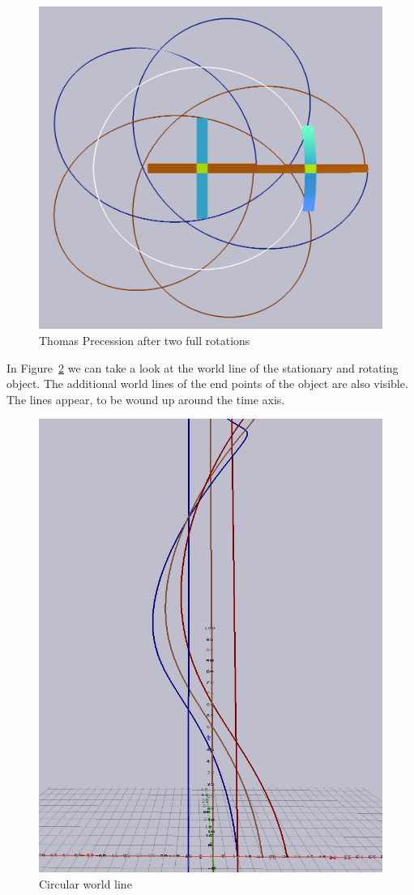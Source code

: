 \documentclass{egpubl}
\begin{document}
\begin{figure}[htb]
  	\centering
	\includegraphics[width=0.8\linewidth]{figures/v06_r20_2rot_path.jpg}
	\caption{Thomas Precession after two full rotations}
	\label{fig:thomasPrec_02}
\end{figure}

In Figure~\ref{fig:circularWL} we can take a look at the world line of the stationary and rotating object. The additional world lines of the end points of the object are also visible. The lines appear, to be wound up around the time axis.
\begin{figure}[htb]
\center
\includegraphics[width=0.8\linewidth]{figures/circularWL.jpg}
\caption{Circular world line}
\label{fig:circularWL}
\end{figure}
\end{document}
